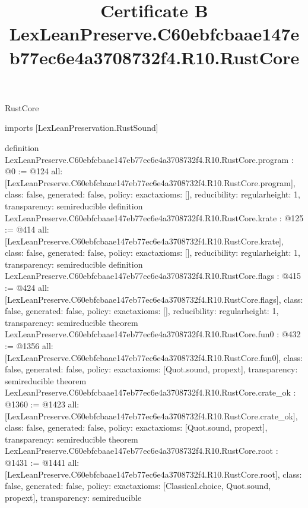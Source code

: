 \begin{lexlean}{RustCore}
\title{Certificate B LexLeanPreserve.C60ebfcbaae147eb77ec6e4a3708732f4.R10.RustCore}
\begin{coremodule}
imports [LexLeanPreservation.RustSound]

definition LexLeanPreserve.C60ebfcbaae147eb77ec6e4a3708732f4.R10.RustCore.program : @0 := @124 {
  all: [LexLeanPreserve.C60ebfcbaae147eb77ec6e4a3708732f4.R10.RustCore.program],
  class: false,
  generated: false,
  policy: exact{axioms: []},
  reducibility: regular{height: 1},
  transparency: semireducible
}
definition LexLeanPreserve.C60ebfcbaae147eb77ec6e4a3708732f4.R10.RustCore.krate : @125 := @414 {
  all: [LexLeanPreserve.C60ebfcbaae147eb77ec6e4a3708732f4.R10.RustCore.krate],
  class: false,
  generated: false,
  policy: exact{axioms: []},
  reducibility: regular{height: 1},
  transparency: semireducible
}
definition LexLeanPreserve.C60ebfcbaae147eb77ec6e4a3708732f4.R10.RustCore.flags : @415 := @424 {
  all: [LexLeanPreserve.C60ebfcbaae147eb77ec6e4a3708732f4.R10.RustCore.flags],
  class: false,
  generated: false,
  policy: exact{axioms: []},
  reducibility: regular{height: 1},
  transparency: semireducible
}
theorem LexLeanPreserve.C60ebfcbaae147eb77ec6e4a3708732f4.R10.RustCore.fun0 : @432 := @1356 {
  all: [LexLeanPreserve.C60ebfcbaae147eb77ec6e4a3708732f4.R10.RustCore.fun0],
  class: false,
  generated: false,
  policy: exact{axioms: [Quot.sound, propext]},
  transparency: semireducible
}
theorem LexLeanPreserve.C60ebfcbaae147eb77ec6e4a3708732f4.R10.RustCore.crate_ok : @1360 := @1423 {
  all: [LexLeanPreserve.C60ebfcbaae147eb77ec6e4a3708732f4.R10.RustCore.crate_ok],
  class: false,
  generated: false,
  policy: exact{axioms: [Quot.sound, propext]},
  transparency: semireducible
}
theorem LexLeanPreserve.C60ebfcbaae147eb77ec6e4a3708732f4.R10.RustCore.root : @1431 := @1441 {
  all: [LexLeanPreserve.C60ebfcbaae147eb77ec6e4a3708732f4.R10.RustCore.root],
  class: false,
  generated: false,
  policy: exact{axioms: [Classical.choice, Quot.sound, propext]},
  transparency: semireducible
}


\end{coremodule}
\end{lexlean}
